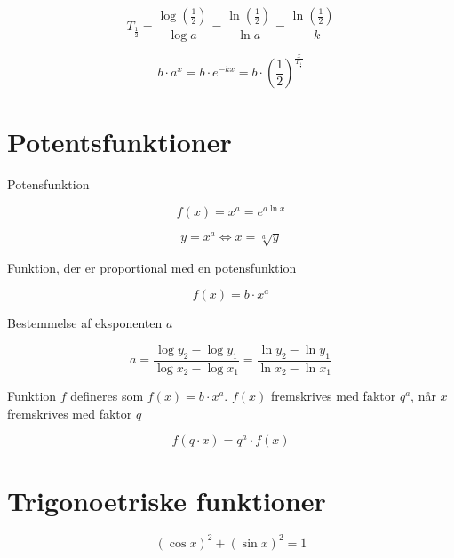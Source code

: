 \documentclass[11pt,a5paper,fleqn,leqno]{book}
\begin{document}
\begin{equation}
T_{\frac{1}{2}} = \frac{\log\left(\frac{1}{2}\right)}{\log a} = \frac{\ln\left(\frac{1}{2}\right)}{\ln a} = \frac{\ln\left(\frac{1}{2}\right)}{-k}
\end{equation}

\begin{equation}
b \cdot a^x = b \cdot e^{-kx} = b \cdot \left(\frac{1}{2}\right)^{\frac{x}{T_{\frac{1}{2}}}}
\end{equation}

\section{Potentsfunktioner}

Potensfunktion

\begin{equation}
f(x) = x^a = e^{a\ln x}
\end{equation}

\begin{equation}
y = x^a \Leftrightarrow x = \sqrt[a]{y}
\end{equation}

Funktion, der er proportional med en potensfunktion

\begin{equation}
f(x) = b \cdot x^a
\end{equation}

Bestemmelse af eksponenten $a$

\begin{equation}
a = \frac{\log y_2 - \log y_1}{\log x_2 - \log x_1} = \frac{\ln y_2 - \ln y_1}{\ln x_2 - \ln x_1}
\end{equation}

Funktion $f$ defineres som $f(x) = b \cdot x^a$. $f(x)$ fremskrives med faktor $q^a$, når $x$ fremskrives med faktor $q$

\begin{equation}
f(q \cdot x) = q^a \cdot f(x)
\end{equation}

\vfill

\section{Trigonoetriske funktioner}

\begin{equation}
(\cos x)^2 + (\sin x)^2 = 1
\end{equation}
\end{document}

